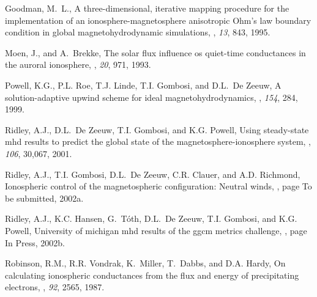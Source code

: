 \begin{thebibliography}{{\em Moen and Brekke}(1993}

Goodman, M.~L.,
\newblock A three-dimensional, iterative mapping procedure for the
  implementation of an ionosphere-magnetosphere anisotropic {Ohm's} law
  boundary condition in global magnetohydrodynamic simulations,
, {\em 13}, 843, 1995.

Moen, J., and A.~Brekke,
\newblock The solar flux influence os quiet-time conductances in the auroral
  ionosphere,
, {\em 20}, 971, 1993.

Powell, K.G., P.L. Roe, T.J. Linde, T.I. Gombosi, and D.L.~De Zeeuw,
\newblock A solution-adaptive upwind scheme for ideal magnetohydrodynamics,
, {\em 154}, 284, 1999.

Ridley, A.J., D.L.~De Zeeuw, T.I. Gombosi, and K.G. Powell,
\newblock Using steady-state mhd results to predict the global state of the
  magnetosphere-ionosphere system,
, {\em 106}, 30,067, 2001.

Ridley, A.J., T.I. Gombosi, D.L.~De Zeeuw, C.R. Clauer, and A.D. Richmond,
\newblock Ionospheric control of the magnetospheric configuration: Neutral
  winds,
, page To be submitted, 2002a.

Ridley, A.J., K.C. Hansen, G.~T\'oth, D.L.~De Zeeuw, T.I. Gombosi, and K.G.
  Powell,
\newblock University of michigan mhd results of the ggcm metrics challenge,
, page In Press, 2002b.

Robinson, R.M., R.R. Vondrak, K.~Miller, T.~Dabbs, and D.A. Hardy,
\newblock On calculating ionospheric conductances from the flux and energy of
  precipitating electrons,
, {\em 92}, 2565, 1987.

\end{thebibliography}
